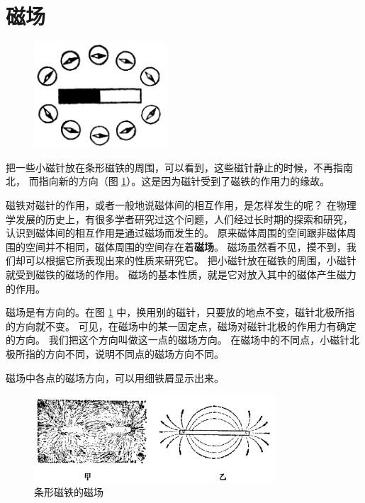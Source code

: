 \section{磁场}\label{sec:10-2}

\begin{figure}
    \centering
    \includegraphics[width=5cm]{../pic/czwl2-ch10-8}
    \caption{}\label{fig:10-8}
\end{figure}

把一些小磁针放在条形磁铁的周围，可以看到，这些磁针静止的时候，不再指南北，
而指向新的方向（图 \ref{fig:10-8}）。这是因为磁针受到了磁铁的作用力的缘故。

磁铁对磁针的作用，或者一般地说磁体间的相互作用，是怎样发生的呢？
在物理学发展的历史上，有很多学者研究过这个问题，人们经过长时期的探索和研究，
认识到磁体间的相互作用是通过磁场而发生的。
原来磁体周围的空间跟非磁体周围的空间并不相同，磁体周围的空间存在着\textbf{磁场}。
磁场虽然看不见，摸不到，我们却可以根据它所表现出来的性质来研究它。
把小磁针放在磁铁的周围，小磁针就受到磁铁的磁场的作用。
磁场的基本性质，就是它对放入其中的磁体产生磁力的作用。

磁场是有方向的。在图 \ref{fig:10-8} 中，换用别的磁针，只要放的地点不变，磁针北极所指的方向就不变。
可见，在磁场中的某一固定点，磁场对磁针北极的作用力有确定的方向。
我们把这个方向叫做这一点的磁场方向。
在磁场中的不同点，小磁针北极所指的方向不同，说明不同点的磁场方向不同。

磁场中各点的磁场方向，可以用细铁屑显示出来。

\begin{figure}[htbp]
    \centering
    \includegraphics[width=0.8\textwidth]{../pic/czwl2-ch10-9}
    \caption{条形磁铁的磁场}\label{fig:10-9}
\end{figure}

